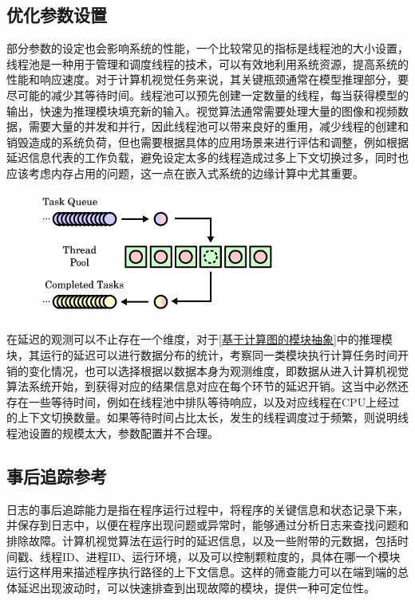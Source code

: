 \documentclass[master]{shtthesis}
\begin{document}
\subsection{优化参数设置}\label{优化参数设置}
部分参数的设定也会影响系统的性能，一个比较常见的指标是线程池的大小设置，线程池是一种用于管理和调度线程的技术，可以有效地利用系统资源，提高系统的性能和响应速度。对于计算机视觉任务来说，其关键瓶颈通常在模型推理部分，要尽可能的减少其等待时间。线程池可以预先创建一定数量的线程，每当获得模型的输出，快速为推理模块填充新的输入。视觉算法通常需要处理大量的图像和视频数据，需要大量的并发和并行，因此线程池可以带来良好的重用，减少线程的创建和销毁造成的系统负荷，但也需要根据具体的应用场景来进行评估和调整，例如根据延迟信息代表的工作负载，避免设定太多的线程造成过多上下文切换过多，同时也应该考虑内存占用的问题，这一点在嵌入式系统的边缘计算中尤其重要\cite{threadpool}。

\begin{figure}[htbp]
	\centering
	\includegraphics[width=8cm]{img/thread_pool.pdf}
	\label{线程池的工作过程}
\end{figure}

在延迟的观测可以不止存在一个维度，对于\ref{基于计算图的模块抽象}中的推理模块，其运行的延迟可以进行数据分布的统计，考察同一类模块执行计算任务时间开销的变化情况，也可以选择根据以数据本身为观测维度，即数据从进入计算机视觉算法系统开始，到获得对应的结果信息对应在每个环节的延迟开销。这当中必然还存在一些等待时间，例如在线程池中排队等待响应，以及对应线程在CPU上经过的上下文切换数量。如果等待时间占比太长，发生的线程调度过于频繁，则说明线程池设置的规模太大，参数配置并不合理。

\subsection{事后追踪参考}\label{事后追踪参考}
日志的事后追踪能力是指在程序运行过程中，将程序的关键信息和状态记录下来，并保存到日志中，以便在程序出现问题或异常时，能够通过分析日志来查找问题和排除故障。计算机视觉算法在运行时的延迟信息，以及一些附带的元数据，包括时间戳、线程ID、进程ID、运行环境，以及可以控制颗粒度的，具体在哪一个模块运行这样用来描述程序执行路径的上下文信息。这样的筛查能力可以在端到端的总体延迟出现波动时，可以快速排查到出现故障的模块，提供一种可定位性。
\end{document}
